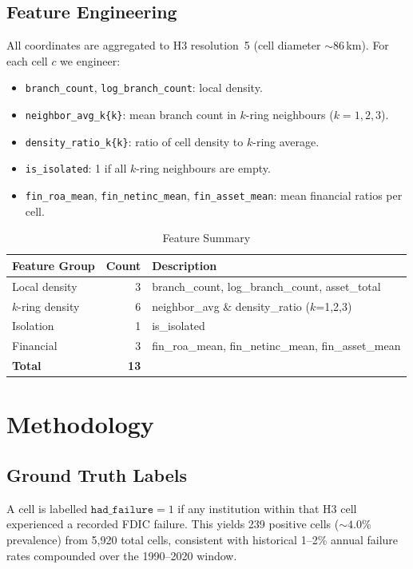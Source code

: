 \documentclass[conference]{IEEEtran}
\begin{document}
\subsection{Feature Engineering}
All coordinates are aggregated to H3 resolution~5 (cell diameter
${\sim}86$\,km). For each cell $c$ we engineer:
\begin{itemize}
\item \texttt{branch\_count}, \texttt{log\_branch\_count}: local density.
\item \texttt{neighbor\_avg\_k\{k\}}: mean branch count in $k$-ring
neighbours ($k = 1, 2, 3$).
\item \texttt{density\_ratio\_k\{k\}}: ratio of cell density to
$k$-ring average.
\item \texttt{is\_isolated}: 1 if all $k$-ring neighbours are empty.
\item \texttt{fin\_roa\_mean}, \texttt{fin\_netinc\_mean},
\texttt{fin\_asset\_mean}: mean financial ratios per cell.
\end{itemize}
\begin{table}[t]
\caption{Feature Summary}
\label{tab:features}
\centering
\begin{tabular}{lrl}
\toprule
Feature Group & Count & Description \\
\midrule
Local density & 3 & branch\_count, log\_branch\_count, asset\_total \\
$k$-ring density & 6 & neighbor\_avg \& density\_ratio ($k$=1,2,3) \\
Isolation & 1 & is\_isolated \\
Financial & 3 & fin\_roa\_mean, fin\_netinc\_mean, fin\_asset\_mean \\
\midrule
\textbf{Total} & \textbf{13} & \\
\bottomrule
\end{tabular}
\end{table}
\section{Methodology}
\subsection{Ground Truth Labels}
A cell is labelled $\texttt{had\_failure}=1$ if any institution within
that H3 cell experienced a recorded FDIC failure. This yields 239
positive cells (${\sim}4.0$\% prevalence) from 5,920 total cells,
consistent with historical 1–2\% annual failure rates compounded over
the 1990–2020 window.
\end{document}
